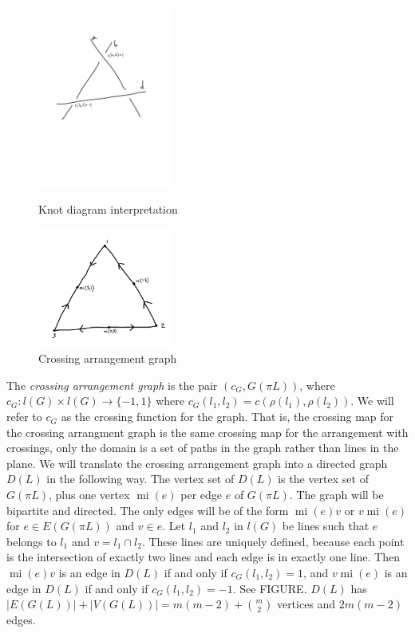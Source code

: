 \documentclass[11pt, oneside]{article}
\newcommand{\mi}{\operatorname{mi}}
\begin{document}
\begin{figure}
\begin{minipage}{0.5\linewidth}
\centering	
\includegraphics[width=0.4\textwidth]{Arrcross}
\caption{Knot diagram interpretation}
\label{fig:first}
\end{minipage}
\begin{minipage}{0.5\linewidth}
\centering
\includegraphics[width=0.4\textwidth]{Digraph}
\caption{Crossing arrangement graph}
\label{fig:second}
\end{minipage}
\end{figure}


The \emph{crossing arrangement graph} is the pair $(c_G, G(\pi L))$, where $c_G: l(G) \times l(G) \to \{-1,1\}$ where $c_G(l_1, l_2) = c(\rho(l_1), \rho(l_2))$. We will refer to $c_G$ as the crossing function for the graph. That is, the crossing map for the crossing arrangment graph is the same crossing map for the arrangement with crossings, only the domain is a set of paths in the graph rather than lines in the plane. 
We will translate the crossing arrangement graph into a directed graph $D(L)$ in the following way. The vertex set of $D(L)$ is the vertex set of $G(\pi L)$, plus one vertex $\mi(e)$ per edge $e$ of $G(\pi L)$. The graph will be bipartite and directed. The only edges will be of the form $\mi(e)v$ or $v \mi(e)$ for $e \in E(G(\pi L))$ and $v \in e$. Let $l_1$ and $l_2$ in $l(G)$ be lines such that $e$ belongs to $l_1$ and $v = l_1 \cap l_2$. 
These lines are uniquely defined, because each point is the intersection of exactly two lines and each edge is in exactly one line. Then $\mi(e)v$ is an edge in $D(L)$ if and only if $c_G(l_1, l_2) = 1$, and $v \mi(e)$ is an edge in $D(L)$ if and only if $c_G(l_1, l_2) = -1$. See FIGURE. $D(L)$ has $|E(G(L))| +  |V(G(L))| = m(m-2) + { m \choose 2}$ vertices and $2m(m-2)$ edges. \\
\end{document}
